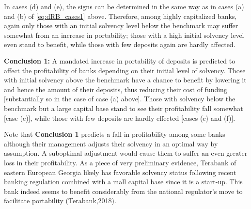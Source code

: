In cases (d) and (e), the signs can be determined in the same way as in cases (a) and (b) of \autoref{eq:dRB_cases1} above.  Therefore, among highly capitalized banks, again only those with an initial solvency level below the benchmark may suffer somewhat from an increase in portability; those with a high initial solvency level even stand to benefit, while those with few deposits again are hardly affected.


\textbf{Conclusion 1:} A mandated increase in portability of deposits is predicted to affect the profitability of banks depending on their initial level of solvency. Those with initial solvency above the benchmark have a chance to benefit by lowering it and hence the amount of their deposits, thus reducing their cost of funding [substantially so in the case of case (a) above]. Those with solvency below the benchmark but a large capital base stand to see their profitability fall somewhat [case (e)], while those with few deposits are hardly effected [cases (c) and (f)].



Note that \textbf{Conclusion 1} predicts a fall in profitability among some banks although their management adjusts their solvency in an optimal way by assumption. A suboptimal adjustment would cause them to suffer an even greater loss in their profitability. As a piece of very preliminary evidence, Terabank of eastern European Georgia likely has favorable solvency status following recent banking regulation combined with a mall capital base since it is a start-up. This bank indeed seems to benefit considerably from the national regulator's move to facilitate portability (Terabank,2018).


